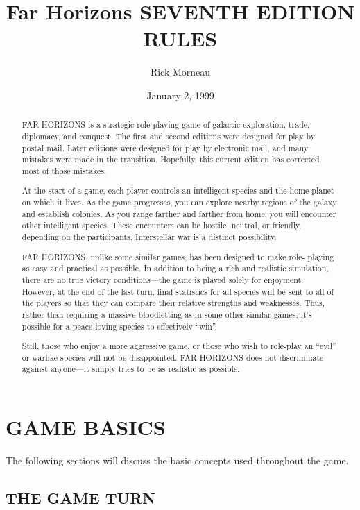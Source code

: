\documentclass[10pt,titlepage]{article}
\title{
\textbf{{\Huge Far Horizons}}
\vspace{10pt}
\hrulefill
\vspace{10pt}
{\small\MakeUppercase{Seventh Edition Rules}}
}
\author{Rick Morneau}
\date{January 2, 1999}
\begin{document}
\maketitle
\begin{abstract}
FAR HORIZONS is a strategic role-playing game of galactic exploration, trade,
diplomacy, and conquest.  The first and second editions were designed for play
by postal mail.  Later editions were designed for play by electronic mail, and
many mistakes were made in the transition.  Hopefully, this current edition has
corrected most of those mistakes.

At the start of a game, each player controls an intelligent species and the
home planet on which it lives.  As the game progresses, you can explore nearby
regions of the galaxy and establish colonies.  As you range farther and farther
from home, you will encounter other intelligent species.  These encounters can
be hostile, neutral, or friendly, depending on the participants.  Interstellar
war is a distinct possibility.

FAR HORIZONS, unlike some similar games, has been designed to make role-
playing as easy and practical as possible.  In addition to being a rich and
realistic simulation, there are no true victory conditions---the game is played
solely for enjoyment.  However, at the end of the last turn, final statistics
for all species will be sent to all of the players so that they can compare
their relative strengths and weaknesses.  Thus, rather than requiring a massive
bloodletting as in some other similar games, it's possible for a peace-loving
species to effectively ``win''.

Still, those who enjoy a more aggressive game, or those who wish to role-play
an ``evil'' or warlike species will not be disappointed.  FAR HORIZONS does not
discriminate against anyone---it simply tries to be as realistic as possible.
\end{abstract}
\newpage
\tableofcontents
\newpage

\section{GAME BASICS}

The following sections will discuss the basic concepts used throughout the
game.


\subsection{THE GAME TURN}
\end{document}
